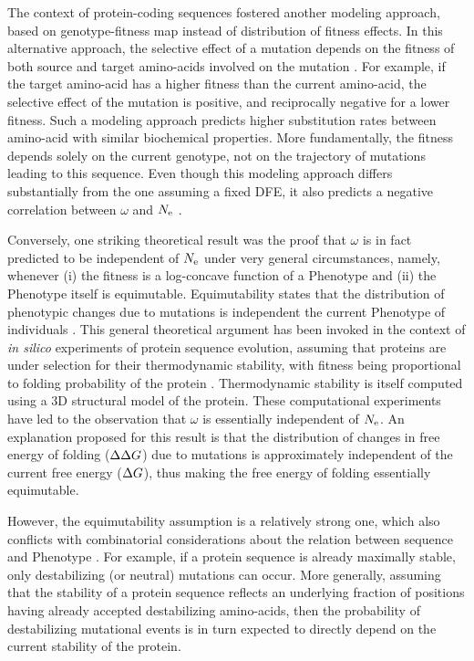 The context of protein-coding sequences fostered another modeling approach, based on genotype-fitness map instead of distribution of fitness effects.
In this alternative approach, the selective effect of a mutation depends on the fitness of both source and target amino-acids involved on the mutation \citep{Halpern1998, Rodrigue2010, Tamuri2012}.
For example, if the target amino-acid has a higher fitness than the current amino-acid, the selective effect of the mutation is positive, and reciprocally negative for a lower fitness.
Such a modeling approach predicts higher \gls{substitution} rates between amino-acid with similar biochemical properties.
More fundamentally, the fitness depends solely on the current genotype, not on the trajectory of mutations leading to this sequence.
Even though this modeling approach differs substantially from the one assuming a fixed \acrshort{DFE}, it also predicts a negative correlation between $\omega$ and $N_{\mathrm{e}}$ \citep{Spielman2015, DosReis2015}.

Conversely, one striking theoretical result was the proof that $\omega$ is in fact predicted to be independent of $N_{\mathrm{e}}$ under very general circumstances, namely, whenever (i) the fitness is a log-concave function of a \gls{Phenotype} and (ii) the \gls{Phenotype} itself is equimutable.
Equimutability states that the distribution of phenotypic changes due to mutations is independent the current \gls{Phenotype} of individuals \citep{Cherry1998}.
This general theoretical argument has been invoked in the context of \textit{in silico} experiments of protein sequence evolution, assuming that proteins are under selection for their thermodynamic stability, with fitness being proportional to  folding probability of the protein \citep{Goldstein2013}.
Thermodynamic stability is itself computed using a 3D structural model of the protein. These computational experiments have led to the observation that $\omega$ is essentially independent of $N_{\mathrm{e}}$.
An explanation proposed for this result is that the distribution of changes in free energy of folding ($\Delta \Delta G$) due to mutations is approximately independent of the current free energy ($\Delta G$), thus making the free energy of folding essentially equimutable.

However, the equimutability assumption is a relatively strong one, which also conflicts with combinatorial considerations about the relation between sequence and \gls{Phenotype} \citep{Serohijos2012}.
For example, if a protein sequence is already maximally stable, only destabilizing (or neutral) mutations can occur.
More generally, assuming that the stability of a protein sequence reflects an underlying fraction of positions having already accepted destabilizing amino-acids, then the probability of destabilizing mutational events is in turn expected to directly depend on the current stability of the protein.

